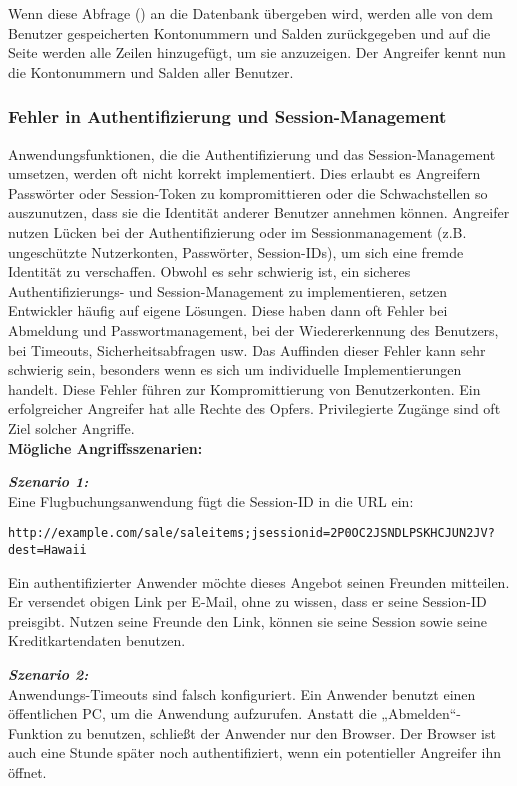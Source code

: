 Wenn diese Abfrage () an die Datenbank übergeben wird, werden alle von dem Benutzer gespeicherten Kontonummern und Salden zurückgegeben und auf die Seite werden alle Zeilen hinzugefügt, um sie anzuzeigen. Der Angreifer kennt nun die Kontonummern und Salden aller Benutzer.

\subsubsection{Fehler in Authentifizierung und Session-Management}

Anwendungsfunktionen, die die Authentifizierung und das Session-Management umsetzen, werden oft nicht korrekt implementiert. Dies erlaubt es Angreifern Passwörter oder Session-Token  zu kompromittieren oder die Schwachstellen so auszunutzen, dass sie die Identität anderer Benutzer annehmen können\cite[6]{owasp17top10}. Angreifer nutzen Lücken bei der Authentifizierung oder im Sessionmanagement (z.B. ungeschützte Nutzerkonten, Passwörter, Session-IDs), um sich eine fremde Identität zu verschaffen. Obwohl es sehr schwierig ist, ein sicheres Authentifizierungs- und Session-Management zu implementieren, setzen Entwickler häufig auf eigene Lösungen. Diese haben dann oft Fehler bei Abmeldung und Passwortmanagement, bei der Wiedererkennung des Benutzers, bei Timeouts, Sicherheitsabfragen usw. Das Auffinden dieser Fehler kann sehr schwierig sein, besonders wenn es sich um individuelle Implementierungen handelt. Diese Fehler führen zur Kompromittierung von Benutzerkonten. Ein erfolgreicher Angreifer hat alle Rechte des Opfers. Privilegierte Zugänge sind oft Ziel solcher Angriffe\cite[8]{owasp17top10}.\\

\textbf{Mögliche Angriffsszenarien:}

\textbf{\textit{Szenario 1:}}\\
Eine Flugbuchungsanwendung fügt die Session-ID in die URL ein\cite[8]{owasp17top10}:

\texttt{http://example.com/sale/saleitems;jsessionid=2P0OC2JSNDLPSKHCJUN2JV?dest=Hawaii}

Ein authentifizierter Anwender möchte dieses Angebot seinen Freunden mitteilen. Er versendet obigen Link per E-Mail, ohne zu wissen, dass er seine Session-ID preisgibt. Nutzen seine Freunde den Link, können sie seine Session sowie seine Kreditkartendaten benutzen.

\textbf{\textit{Szenario 2:}}\\
Anwendungs-Timeouts sind falsch konfiguriert. Ein
Anwender benutzt einen öffentlichen PC, um die Anwendung
aufzurufen. Anstatt die „Abmelden“-Funktion zu benutzen, schließt
der Anwender nur den Browser. Der Browser ist auch eine Stunde
später noch authentifiziert, wenn ein potentieller Angreifer ihn
öffnet\cite[8]{owasp17top10}.

